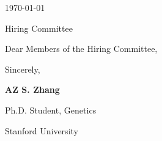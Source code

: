 \documentclass[letterpaper]{cv} %
\begin{document}
{\color{notiongray}\today}

\vspace{0.6em}
{\setlength{\parskip}{0pt}
Hiring Committee\par
[Department/Group Name]\par
[Division Name]\par
[Company/Institution Name]\par
[City, State ZIP]\par}

\vspace{0.8em}
Dear Members of the Hiring Committee,

\setlength{\parskip}{0.75em}




\vspace{0.6em}
{\setlength{\parskip}{0pt}
Sincerely,\par\vspace{0.4em}
{\bfseries\color{black}AZ S. Zhang}\par
{\color{notiongray}Ph.D. Student, Genetics}\par
{\color{notiongray}Stanford University}\par}
\end{document}
